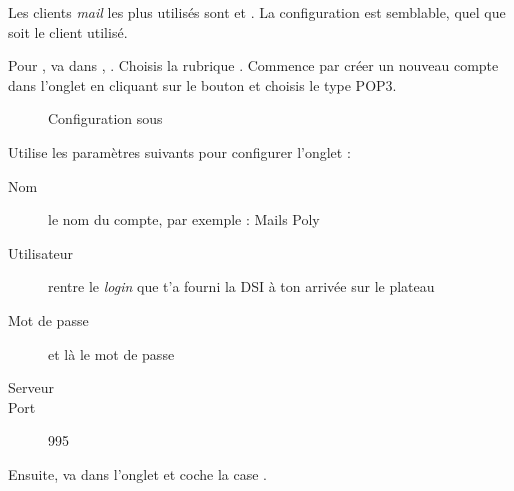  Les clients \emph{mail} les plus
utilis\'es sont  et . La configuration est semblable, quel que soit le
client utilis\'e.

Pour , va dans , . Choisis la
rubrique . Commence par cr\'eer un nouveau compte dans
l'onglet  en cliquant sur le bouton
 et choisis le type POP3.


\noindent
  \begin{figure}[!h]
    \begin{center}  
         	 \caption{Configuration sous }
    \end{center}
  \end{figure}


Utilise les param\`etres suivants pour configurer l'onglet  :
\begin{description}
  \item[Nom] le nom du compte, par exemple : Mails Poly
  \item[Utilisateur] rentre le \emph{login}  que t'a fourni la DSI \`a  ton arriv\'ee sur le plateau
  \item[Mot de passe] et l\`a  le mot de passe 
  \item[Serveur] 
  \item[Port] 995
\end{description}
Ensuite, va dans l'onglet  et coche la case
.

